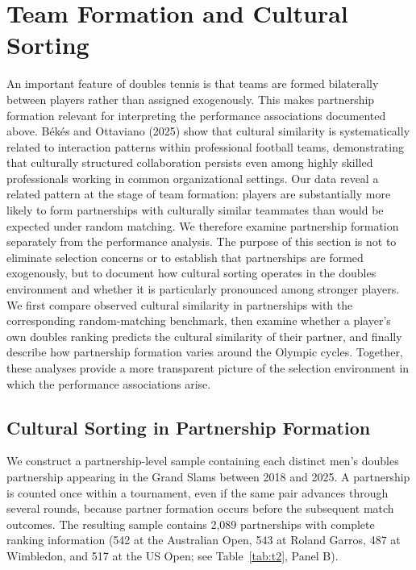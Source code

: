 \documentclass[10pt]{article}
\begin{document}
\section{Team Formation and Cultural Sorting}
An important feature of doubles tennis is that teams are formed bilaterally between players rather than assigned exogenously. This makes partnership formation relevant for interpreting the performance associations documented above. Békés and Ottaviano (2025) show that cultural similarity is systematically related to interaction patterns within professional football teams, demonstrating that culturally structured collaboration persists even among highly skilled professionals working in common organizational settings. Our data reveal a related pattern at the stage of team formation: players are substantially more likely to form partnerships with culturally similar teammates than would be expected under random matching. We therefore examine partnership formation separately from the performance analysis. The purpose of this section is not to eliminate selection concerns or to establish that partnerships are formed exogenously, but to document how cultural sorting operates in the doubles environment and whether it is particularly pronounced among stronger players. We first compare observed cultural similarity in partnerships with the corresponding random-matching benchmark, then examine whether a player's own doubles ranking predicts the cultural similarity of their partner, and finally describe how partnership formation varies around the Olympic cycles. Together, these analyses provide a more transparent picture of the selection environment in which the performance associations arise.

\subsection{Cultural Sorting in Partnership Formation}
\label{sec:sorting}


We construct a partnership-level sample containing each distinct men's doubles partnership appearing in the Grand Slams between 2018 and 2025. A partnership is counted once within a tournament, even if the same pair advances through several rounds, because partner formation occurs before the subsequent match outcomes. The resulting sample contains 2,089 partnerships with complete ranking information (542 at the Australian Open, 543 at Roland Garros, 487 at Wimbledon, and 517 at the US Open; see Table~\ref{tab:t2}, Panel B).
\end{document}
